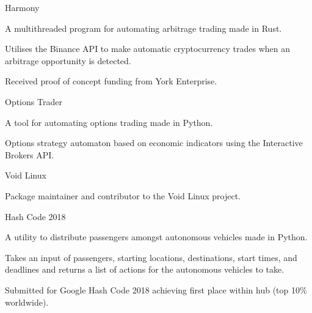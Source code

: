 
\begin{cventries}
  \cventry
    {} %
    {Harmony} %
    {} %
    {} %
    {
      \begin{cvitems} %
        \item {A multithreaded program for automating arbitrage trading made in Rust.}
        \vspace{0.5mm}
		\item {Utilises the Binance API to make automatic cryptocurrency trades when an arbitrage opportunity is detected.}
		\vspace{0.5mm}
		\item {Received proof of concept funding from York Enterprise.}
      \end{cvitems}
    }

  \cventry
    {} %
    {Options Trader} %
    {} %
    {} %
    {
      \begin{cvitems} %
        \item {A tool for automating options trading made in Python.}
        \vspace{0.5mm}
		\item {Options strategy automaton based on economic indicators using the Interactive Brokers API.}
      \end{cvitems}
    }

  \cventry
    {} %
    {Void Linux} %
    {} %
    {} %
    {
      \begin{cvitems} %
      	\item {Package maintainer and contributor to the Void Linux project.}
      \end{cvitems}
    }

  \cventry
    {} %
    {Hash Code 2018} %
    {} %
    {} %
    {
      \begin{cvitems} %
      	\item {A utility to distribute passengers amongst autonomous vehicles made in Python.}
      	\vspace{0.5mm}
		\item {Takes an input of passengers, starting locations, destinations, start times, and deadlines and returns a list of actions for the autonomous vehicles to take.}
		\vspace{0.5mm}
		\item {Submitted for Google Hash Code 2018 achieving first place within hub (top 10\% worldwide).}
      \end{cvitems}
    }
\end{cventries}
